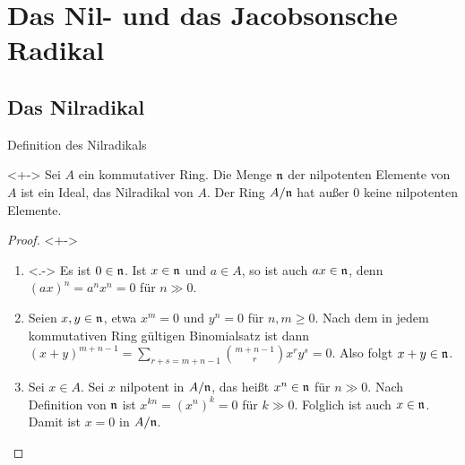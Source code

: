 \section{Das Nil- und das Jacobsonsche Radikal}

\subsection{Das Nilradikal}

\begin{frame}{Definition des Nilradikals}
    \begin{proposition}<+->
        Sei \(A\) ein kommutativer Ring. Die Menge \(\mathfrak{n}\) der nilpotenten
        Elemente von \(A\) ist ein Ideal, das \alert{Nilradikal von \(A\)}. Der Ring
        \(A/\mathfrak{n}\) hat außer \(0\) keine nilpotenten Elemente.
    \end{proposition}
    \begin{proof}<+->
        \begin{enumerate}[<+->]
        \item<.->
            Es ist \(0 \in \mathfrak{n}\). Ist \(x \in \mathfrak{n}\) und \(a \in A\), so
            ist auch \(a x \in \mathfrak{n}\), denn \((a x)^n = a^n x^n = 0\) für
            \(n \gg 0\).
        \item   
            Seien \(x, y \in \mathfrak{n}\), etwa \(x^m = 0\) und \(y^n = 0\) für
            \(n, m \ge 0\). Nach dem in jedem kommutativen Ring gültigen Binomialsatz
            ist dann
            \((x + y)^{m + n - 1} = \sum\limits_{r + s = m + n - 1} \binom{m + n - 1} r
            x^r y^s = 0\). Also folgt \(x + y \in \mathfrak{n}\).
        \item
            Sei \(x \in A\). Sei \(x\) nilpotent in \(A/\mathfrak{n}\), das heißt
            \(x^n \in \mathfrak{n}\) für \(n \gg 0\). Nach Definition von \(\mathfrak{n}\)
            ist \(x^{kn} = (x^n)^k = 0\) für \(k \gg 0\). Folglich ist auch
            \(x \in \mathfrak{n}\). Damit ist \(x = 0\) in \(A/\mathfrak{n}\).
            \qedhere
        \end{enumerate}
    \end{proof}
\end{frame}

